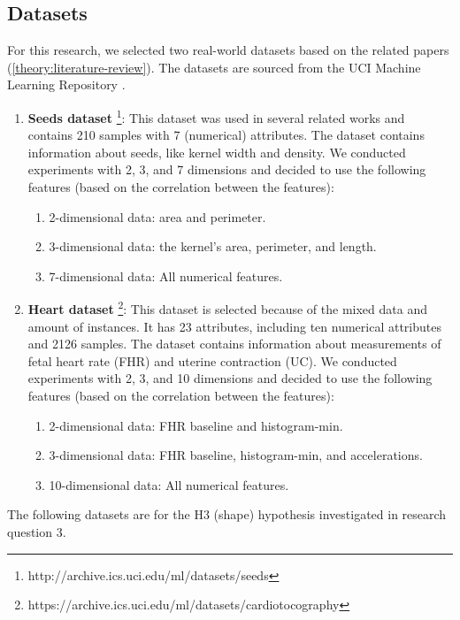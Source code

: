 \subsection{Datasets} \label{datasets-section}
For this research, we selected two real-world datasets based on the related papers (\ref{theory:literature-review}).
The datasets are sourced from the UCI Machine Learning Repository \citep{noauthor_uci_nodate}.
\begin{enumerate}
    \item \textbf{Seeds dataset} \footnote{http://archive.ics.uci.edu/ml/datasets/seeds}: This dataset was used in several related works and contains 210 samples with 7 (numerical) attributes.
          The dataset contains information about seeds, like kernel width and density.
          We conducted experiments with 2, 3, and 7 dimensions and decided to use the following features (based on the correlation between the features):
          \begin{enumerate}
              \item 2-dimensional data: area and perimeter.
              \item 3-dimensional data: the kernel's area, perimeter, and length.
              \item 7-dimensional data: All numerical features.
          \end{enumerate}
    \item \textbf{Heart dataset} \footnote{https://archive.ics.uci.edu/ml/datasets/cardiotocography}: This dataset is selected because of the mixed data and amount of instances.
          It has 23 attributes, including ten numerical attributes and 2126 samples.
          The dataset contains information about measurements of fetal heart rate (FHR) and uterine contraction (UC).
          We conducted experiments with 2, 3, and 10 dimensions and decided to use the following features (based on the correlation between the features):
          \begin{enumerate}
              \item 2-dimensional data: FHR baseline and histogram-min.
              \item 3-dimensional data: FHR baseline, histogram-min, and accelerations.
              \item 10-dimensional data: All numerical features.
          \end{enumerate}
\end{enumerate}
The following datasets are for the H3 (shape) hypothesis investigated in research question 3.

